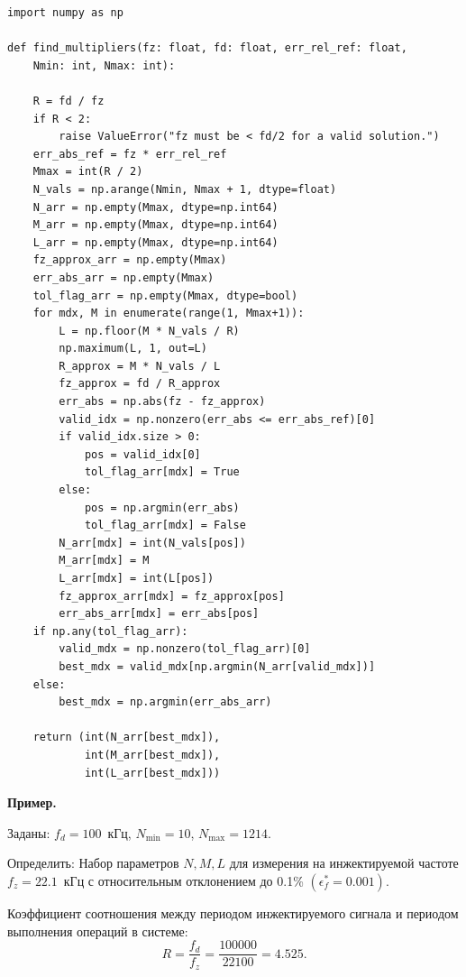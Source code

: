 \begin{listing}[htbp]
    \caption{Программа поиска оптимального набора параметров}
    \begin{verbatim}
import numpy as np

def find_multipliers(fz: float, fd: float, err_rel_ref: float,
    Nmin: int, Nmax: int):

    R = fd / fz
    if R < 2:
        raise ValueError("fz must be < fd/2 for a valid solution.")
    err_abs_ref = fz * err_rel_ref
    Mmax = int(R / 2)
    N_vals = np.arange(Nmin, Nmax + 1, dtype=float)
    N_arr = np.empty(Mmax, dtype=np.int64)
    M_arr = np.empty(Mmax, dtype=np.int64)
    L_arr = np.empty(Mmax, dtype=np.int64)
    fz_approx_arr = np.empty(Mmax)
    err_abs_arr = np.empty(Mmax)
    tol_flag_arr = np.empty(Mmax, dtype=bool)
    for mdx, M in enumerate(range(1, Mmax+1)):
        L = np.floor(M * N_vals / R)
        np.maximum(L, 1, out=L)
        R_approx = M * N_vals / L
        fz_approx = fd / R_approx
        err_abs = np.abs(fz - fz_approx)
        valid_idx = np.nonzero(err_abs <= err_abs_ref)[0]
        if valid_idx.size > 0:
            pos = valid_idx[0]
            tol_flag_arr[mdx] = True
        else:
            pos = np.argmin(err_abs)
            tol_flag_arr[mdx] = False
        N_arr[mdx] = int(N_vals[pos])
        M_arr[mdx] = M
        L_arr[mdx] = int(L[pos])
        fz_approx_arr[mdx] = fz_approx[pos]
        err_abs_arr[mdx] = err_abs[pos]
    if np.any(tol_flag_arr):
        valid_mdx = np.nonzero(tol_flag_arr)[0]
        best_mdx = valid_mdx[np.argmin(N_arr[valid_mdx])]
    else:
        best_mdx = np.argmin(err_abs_arr)   
    
    return (int(N_arr[best_mdx]),
            int(M_arr[best_mdx]),
            int(L_arr[best_mdx]))
    \end{verbatim}
\end{listing}

\clearpage
{}
\textbf{Пример.}

Заданы: ${f_d=100}$~кГц, ${N_\text{min}=10}$, ${N_\text{max}=1214}$.

Определить: Набор параметров ${N, M, L}$ для измерения на инжектируемой частоте ${f_z=\num{22.1}}$~кГц с относительным отклонением до \num{0.1}\% ${\left(\epsilon^{*}_{f}=\num{0.001}\right)}$.

Коэффициент соотношения между периодом инжектируемого сигнала и периодом выполнения операций в системе:
\begin{equation*}
    R = \frac{f_d}{f_z} = \frac{\num{100000}}{\num{22100}} = \num{4.525}.
\end{equation*}

